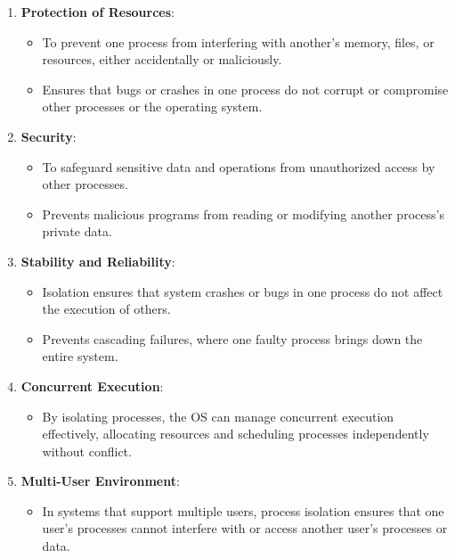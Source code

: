 \documentclass[a4paper]{book}
\begin{document}
\begin{enumerate}
\item 
\textbf{Protection of Resources}:
\begin{itemize}
\item 
To prevent one process from interfering with another’s memory, files, or resources, either accidentally or maliciously.

\item 
Ensures that bugs or crashes in one process do not corrupt or compromise other processes or the operating system.

\end{itemize}

\item 
\textbf{Security}:
\begin{itemize}
\item 
To safeguard sensitive data and operations from unauthorized access by other processes.

\item 
Prevents malicious programs from reading or modifying another process’s private data.

\end{itemize}

\item 
\textbf{Stability and Reliability}:
\begin{itemize}
\item 
Isolation ensures that system crashes or bugs in one process do not affect the execution of others.

\item 
Prevents cascading failures, where one faulty process brings down the entire system.

\end{itemize}

\item 
\textbf{Concurrent Execution}:
\begin{itemize}
\item 
By isolating processes, the OS can manage concurrent execution effectively, allocating resources and scheduling processes independently without conflict.

\end{itemize}

\item 
\textbf{Multi-User Environment}:
\begin{itemize}
\item 
In systems that support multiple users, process isolation ensures that one user's processes cannot interfere with or access another user's processes or data.

\end{itemize}

\end{enumerate}
\hrulefill
\end{document}
